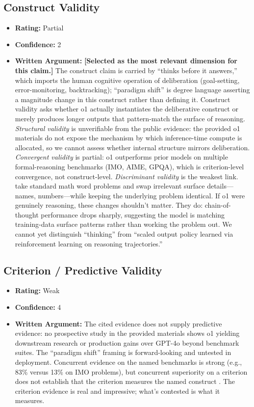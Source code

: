 \subsection{Construct Validity}
\begin{itemize}
    \item \textbf{Rating:} Partial
    \item \textbf{Confidence:} 2
    \item \textbf{Written Argument:} \textbf{[Selected as the most relevant dimension for this claim.]} The construct claim is carried by ``thinks before it answers,'' which imports the human cognitive operation of deliberation (goal-setting, error-monitoring, backtracking); ``paradigm shift'' is degree language asserting a magnitude change in this construct rather than defining it. Construct validity asks whether o1 actually instantiates the deliberative construct or merely produces longer outputs that pattern-match the surface of reasoning. \emph{Structural validity} is unverifiable from the public evidence: the provided o1 materials do not expose the mechanism by which inference-time compute is allocated, so we cannot assess whether internal structure mirrors deliberation. \emph{Convergent validity} is partial: o1 outperforms prior models on multiple formal-reasoning benchmarks (IMO, AIME, GPQA), which is criterion-level convergence, not construct-level. \emph{Discriminant validity} is the weakest link. \citet{mirzadeh2025gsm} take standard math word problems and swap irrelevant surface details---names, numbers---while keeping the underlying problem identical. If o1 were genuinely reasoning, these changes shouldn't matter. They do: chain-of-thought performance drops sharply, suggesting the model is matching training-data surface patterns rather than working the problem out. We cannot yet distinguish ``thinking'' from ``scaled output policy learned via reinforcement learning on reasoning trajectories.''
\end{itemize}

\subsection{Criterion / Predictive Validity}
\begin{itemize}
    \item \textbf{Rating:} Weak
    \item \textbf{Confidence:} 4
    \item \textbf{Written Argument:} The cited evidence does not supply predictive evidence: no prospective study in the provided materials shows o1 yielding downstream research or production gains over GPT-4o beyond benchmark suites. The ``paradigm shift'' framing is forward-looking and untested in deployment. Concurrent evidence on the named benchmarks is strong (e.g., 83\% versus 13\% on IMO problems), but concurrent superiority on a criterion does not establish that the criterion measures the named construct \citep{salaudeen2025measurement}. The criterion evidence is real and impressive; what's contested is what it measures.
\end{itemize}

